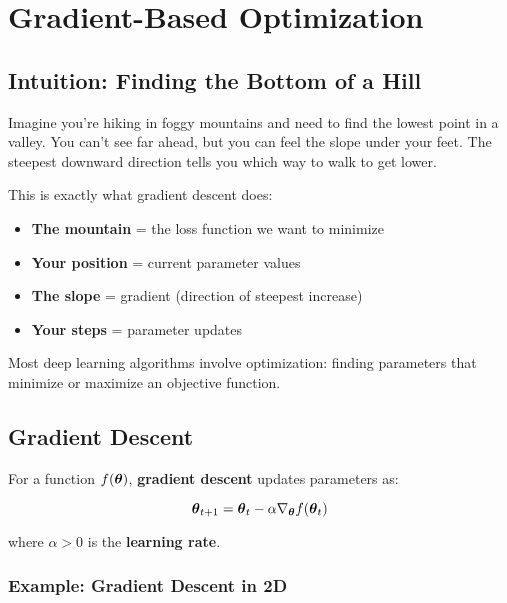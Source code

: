 
\section{Gradient-Based Optimization }
\label{sec:gradient-optimization}

\subsection{Intuition: Finding the Bottom of a Hill}

Imagine you're hiking in foggy mountains and need to find the lowest point in a valley. You can't see far ahead, but you can feel the slope under your feet. The steepest downward direction tells you which way to walk to get lower.

This is exactly what gradient descent does:
\begin{itemize}
    \item \textbf{The mountain} = the loss function we want to minimize
    \item \textbf{Your position} = current parameter values
    \item \textbf{The slope} = gradient (direction of steepest increase)
    \item \textbf{Your steps} = parameter updates
\end{itemize}

Most deep learning algorithms involve optimization: finding parameters that minimize or maximize an objective function.

\subsection{Gradient Descent}

For a function $f(\boldsymbol{\theta})$, \textbf{gradient descent} updates parameters as:

\begin{equation}
\boldsymbol{\theta}_{t+1} = \boldsymbol{\theta}_t - \alpha \nabla_{\boldsymbol{\theta}} f(\boldsymbol{\theta}_t)
\end{equation}

where $\alpha > 0$ is the \textbf{learning rate}.

\subsubsection{Example: Gradient Descent in 2D}


